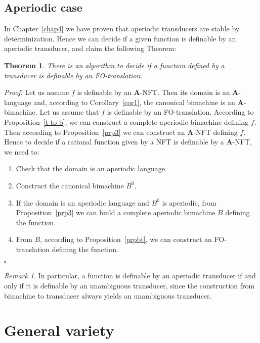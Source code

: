 \documentclass[12pt]{report}
\newtheorem{thm}{Theorem}[section]
\theoremstyle{definition}
\theoremstyle{remark}
\newtheorem{rmk}{Remark}[section]
\newenvironment{prf}
{\textit{Proof:}}
{\hfill $\square$\\}
\begin{document}
\subsection{Aperiodic case}

In Chapter~\ref{chap4} we have proven that aperiodic transducers are stable by determinization. Hence we can decide if a given function is definable by an aperiodic transducer, and claim the following Theorem:

\begin{thm}
There is an algorithm to decide if a function defined by a transducer is definable by an FO-translation.
\end{thm}

\begin{prf}
Let us assume $f$ is definable by an \textbf A-NFT. Then its domain is an \textbf A-language and, according to Corollary~\ref{cor1}, the canonical bimachine is an \textbf A-bimachine.
Let us assume that $f$ is definable by an FO-translation.
According to Proposition~\ref{t-to-b}, we can construct a complete aperiodic bimachine defining $f$.
Then according to Proposition~\ref{prp3} we can construct an \textbf A-NFT defining $f$.
Hence to decide if a rational function given by a NFT is definable by a \textbf A-NFT, we need to:
\begin{enumerate}
\item Check that the domain is an aperiodic language.
\item Construct the canonical bimachine $B^0$.
\item If the domain is an aperiodic language and $B^0$ is aperiodic, from Proposition~\ref{prp3} we can build a complete aperiodic bimachine $B$ defining the function.
\item From $B$, according to Proposition~\ref{prpbt}, we can construct an FO-translation defining the function.
\end{enumerate}
\end{prf}

\begin{rmk}
In particular, a function is definable by an aperiodic transducer if and only if it is definable by an unambiguous transducer, since the construction from bimachine to transducer always yields an unambiguous transducer.
\end{rmk}


\section{General variety}
\end{document}
